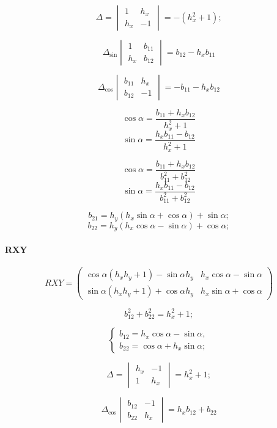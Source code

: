 $$\Delta = \begin{vmatrix}
	1 & h_x\\
	h_x & -1
\end{vmatrix} = - (h_x^2 + 1);$$

$$\Delta_{\sin}\begin{vmatrix}
	1 & b_{11}\\
	h_x &   b_{12}
\end{vmatrix} = b_{12} -  h_x b_{11}$$

$$\Delta_{\cos}\begin{vmatrix}
	b_{11} & h_x\\
	b_{12} & -1
\end{vmatrix} = -b_{11} - h_x b_{12}$$

$$\cos\alpha = \frac{b_{11} + h_x b_{12}}{h_x^2 + 1}$$
$$\sin\alpha = \frac{h_x b_{11} - b_{12}}{h_x^2 + 1}$$

$$\cos\alpha = \frac{b_{11} + h_x b_{12}}{b_{11}^2 + b_{12}^2}$$
$$\sin\alpha = \frac{h_x b_{11} - b_{12}}{b_{11}^2 + b_{12}^2}$$

$$b_{21} = {h_y}\left( {h_x}\sin\alpha + \cos\alpha\right) +  \sin\alpha;$$
$$b_{22} = {h_y}\left( {h_x}\cos\alpha - \sin\alpha\right) +  \cos\alpha;$$

\paragraph{RXY}

\[
RXY =
\begin{pmatrix}
	\cos\alpha \left( {h_x} {h_y}+1\right) -\sin\alpha {h_y} & 
	{h_x} \cos\alpha -\sin\alpha\\
	\sin\alpha \left( {h_x} {h_y}+1\right) +\cos\alpha {h_y} & 
	{h_x} \sin\alpha +\cos\alpha
\end{pmatrix}
\]

$$b_{12}^2 + b_{22}^2 = h_x^2 + 1;$$

$$\begin{cases}
	b_{12} = {h_x} \cos\alpha -\sin\alpha,\\
	b_{22} = \cos\alpha + {h_x} \sin\alpha;
\end{cases}$$

$$\Delta = \begin{vmatrix}
	h_x & -1\\
	1 & h_x
\end{vmatrix} = h_x^2 + 1;$$

$$\Delta_{\cos}\begin{vmatrix}
	b_{12} & -1\\
	b_{22} & h_x
\end{vmatrix} = h_x b_{12} + b_{22}$$

